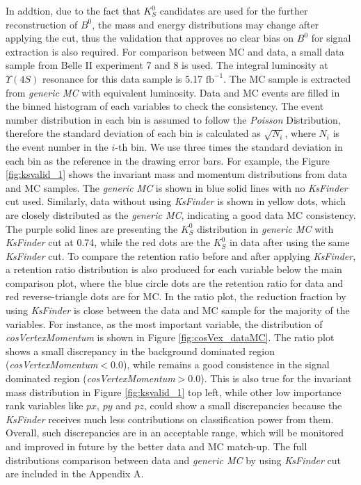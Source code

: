 In addtion, due to the fact that $K_S^0$ candidates are used for the further reconstruction of $B^0$, the  mass and energy distributions may change after applying the cut, thus the validation that approves no clear bias on $B^0$ for signal extraction is also required. For comparison between MC and data, a small data sample from Belle II experiment 7 and 8 is used. The integral luminosity at $\Upsilon(4S)$ resonance for this data sample is 5.17 $\text{fb}^{-1}$. The MC sample is extracted from \textit{generic MC} with equivalent luminosity. Data and MC events are filled in the binned histogram of each variables to check the consistency. 
The event number distribution in each bin is assumed to follow the \textit{Poisson} Distribution, therefore the standard deviation of each bin is calculated as $\sqrt{N_i}$, where $N_i$ is the event number in the $i$-th bin. We use three times the standard deviation in each bin as the reference in the drawing error bars.  For example, the Figure \ref{fig:ksvalid_1} shows the invariant mass and momentum distributions from data and MC samples. The \textit{generic MC} is shown in blue solid lines with no \textit{KsFinder} cut used. Similarly, data without using \textit{KsFinder} is shown in yellow dots, which are closely distributed as the \textit{generic MC}, indicating a good data MC consistency. The purple solid lines are presenting the $K_S^0$ distribution in \textit{generic MC} with \textit{KsFinder} cut at 0.74, while the red dots are the $K_S^0$ in data after using the same \textit{KsFinder} cut. To compare the retention ratio before and after applying \textit{KsFinder}, a retention ratio distribution is also produced for each variable below the main comparison plot, where the blue circle dots are the retention ratio for data and red reverse-triangle dots are for MC.
In the ratio plot, the reduction fraction by using \textit{KsFinder} is close between the data and MC sample for the majority of the variables. For instance, as the most important variable, the distribution of \textit{cosVertexMomentum} is shown in Figure \ref{fig:cosVex_dataMC}. The ratio plot shows a small discrepancy in the background dominated region (\textit{cosVertexMomentum}$<0.0$), while remains a good consistence in the signal dominated region (\textit{cosVertexMomentum}$>0.0$). This is also true for the invariant mass distribution in Figure \ref{fig:ksvalid_1} top left, while other low importance rank variables like $px$, $py$ and $pz$, could show a small discrepancies because the \textit{KsFinder} receives much less contributions on classification power from them. Overall, such discrepancies are in an acceptable range, which will be monitored and improved in future by the better data and MC match-up.  The full distributions comparison between data and \textit{generic MC} by using  \textit{KsFinder} cut are included in the Appendix A.  

